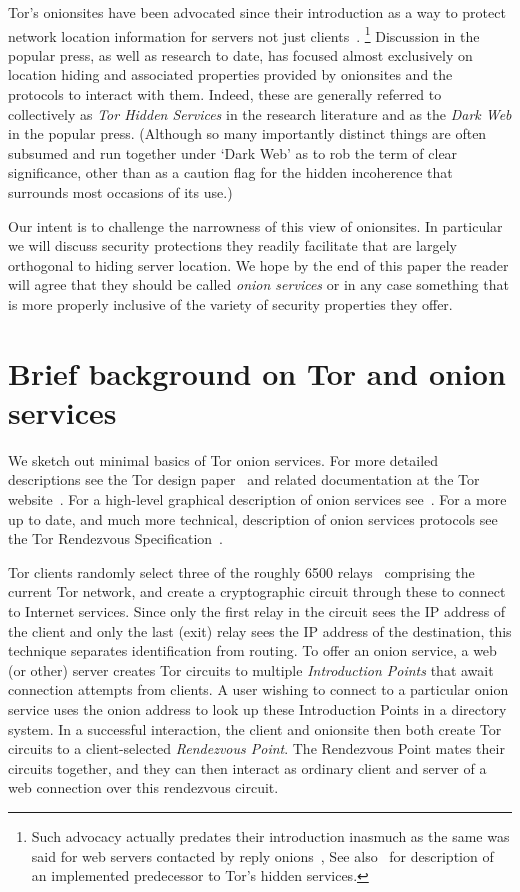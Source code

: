 \documentclass[10pt, conference, compsocconf]{styles/IEEEtran}
\begin{document}
Tor's onionsites have been advocated since their introduction as a
way to protect network location information for servers not just
clients~\cite{tor-design}. \footnote{Such advocacy actually predates
  their introduction inasmuch as the same was said for web servers
  contacted by reply onions~\cite{onion-routing:cacm99}, See
  also~\cite{rewebber} for description of an implemented predecessor
  to Tor's hidden services.}  Discussion in the popular press, as well
as research to date, has focused almost exclusively on location hiding
and associated properties provided by onionsites and the protocols
to interact with them. Indeed, these are generally referred to
collectively as \emph{Tor Hidden Services} in the research literature
and as the \emph{Dark Web} in the popular press. (Although so many
importantly distinct things are often subsumed and run together under
`Dark Web' as to rob the term of clear significance, other than as a
caution flag for the hidden incoherence that surrounds
most occasions of its use.)

Our intent is to challenge the narrowness of this view of
onionsites. In particular we will discuss security protections they
readily facilitate that are largely orthogonal to hiding server
location. We hope by the end of this paper the reader will agree that
they should be called \emph{onion services} or in any
case something that is more properly inclusive of the variety of
security properties they offer.

\section{Brief background on Tor and onion services}

We sketch out minimal basics of Tor onion services. For more detailed
descriptions see the Tor design paper~\cite{tor-design} and related documentation at the
Tor website~\cite{torproject}. For a high-level graphical description
of onion services see~\cite{tor-hs}. For a more up to date, and much
more technical, description of onion services protocols see the Tor
Rendezvous Specification~\cite{tor-rend-spec}.

Tor clients randomly select three of the roughly 6500 relays~\cite{tor-network-size}
comprising the current Tor network, and create a cryptographic circuit
through these to connect to Internet services. Since only the first
relay in the circuit sees the IP address of the client and
only the last (exit) relay sees the IP address of the destination,
this technique separates identification from routing.
To offer an onion service, a web (or other) server creates Tor circuits to
multiple \emph{Introduction Points} that await connection attempts
from clients. A user wishing to connect to a particular onion service
uses the onion address to look up these Introduction Points in a
directory system. In a successful interaction, the client and
onionsite then both create Tor circuits to a client-selected
\emph{Rendezvous Point}. The Rendezvous Point mates their circuits
together, and they can then interact as ordinary client and server of
a web connection over this rendezvous circuit.
\end{document}
